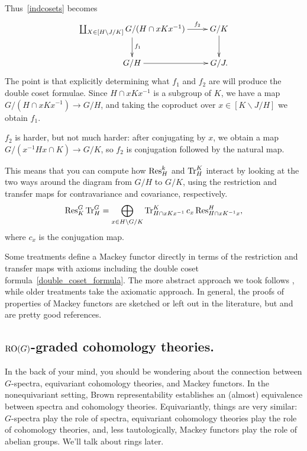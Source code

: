 Thus~\eqref{indcosets} becomes
\begin{equation}
\label{finalcsdiag}
\gathxy{
	\coprod_{X\in[H\backslash J/K]} G/(H\cap xKx^{-1})\ar[r]^-{f_2}\ar[d]^{f_1} & G/K\ar[d]\\
	G/H\ar[r] & G/J.
}
\end{equation}
The point is that explicitly determining what $f_1$ and $f_2$ are will produce the double coset formulae. Since
$H\cap xKx^{-1}$ is a subgroup of $K$, we have a map $G/(H\cap xKx^{-1})\to G/H$, and taking the coproduct over
$x\in[K\backslash J/H]$ we obtain $f_1$.

$f_2$ is harder, but not much harder: after conjugating by $x$, we obtain a map $G/(x^{-1}Hx\cap K)\to G/K$,
so $f_2$ is conjugation followed by the natural map.

This means that you can compute how $\operatorname{Res}_H^k$ and $\operatorname{Tr}_H^K$ interact by looking at the two ways around the
diagram from $G/H$ to $G/K$, using the restriction and transfer maps for contravariance and covariance,
respectively.
\begin{equation}
\label{double_coset_formula}
\operatorname{Res}_K^G\operatorname{Tr}_H^G = \bigoplus_{x\in H\backslash G/K} \operatorname{Tr}_{H\cap xKx^{-1}}^K c_x\operatorname{Res}_{H\cap xK^{-1}x}^H,
\end{equation}
where $c_x$ is the conjugation map.
\begin{rem}
Some treatments define a Mackey functor directly in terms of the restriction and transfer maps with axioms
including the double coset formula~\eqref{double_coset_formula}. The more abstract approach we took follows
\cite{Dress}, while older treatments take the axiomatic approach. In general, the proofs of properties of Mackey
functors are sketched or left out in the literature, but \cite{Webb} and  are pretty good
references.
\end{rem}
\subsection*{$\mathrm{RO}(G)$-graded cohomology theories.}
In the back of your mind, you should be wondering about the connection between $G$-spectra, equivariant cohomology
theories, and Mackey functors. In the nonequivariant setting, Brown representability establishes an (almost)
equivalence between spectra and cohomology theories. Equivariantly, things are very similar: $G$-spectra play the
role of spectra, equivariant cohomology theories play the role of cohomology theories, and, less tautologically,
Mackey functors play the role of abelian groups. We'll talk about rings later.

